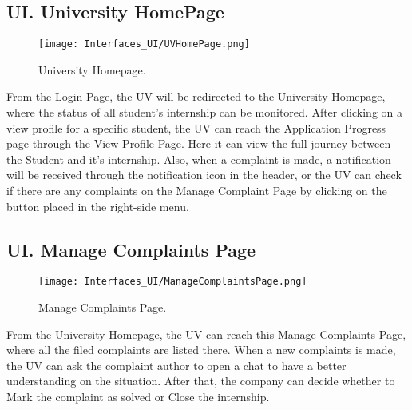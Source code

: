\subsection*{UI\cui . University HomePage}

\begin{figure}[H]
    \begin{center}
        \texttt{[image: Interfaces\_UI/UVHomePage.png]}
        \caption{University Homepage.}
        \label{fig:university_homepage}%
    \end{center}   
\end{figure}

From the Login Page, the UV will be redirected to the University Homepage, where the status of all student's internship can be monitored. After clicking on a view profile for a specific student, the UV can reach the Application Progress page through the View Profile Page. Here it can view the full journey between the Student and it's internship. Also, when a complaint is made, a notification will be received through the notification icon in the header, or the UV can check if there are any complaints on the Manage Complaint Page by clicking on the button placed in the right-side menu. 

\subsection*{UI\cui . Manage Complaints Page}

\begin{figure}[H]
    \begin{center}
        \texttt{[image: Interfaces\_UI/ManageComplaintsPage.png]}
        \caption{Manage Complaints Page.}
        \label{fig:manage_complaints_page}%
    \end{center}   
\end{figure}

From the University Homepage, the UV can reach this Manage Complaints Page, where all the filed complaints are listed there. When a new complaints is made, the UV can ask the complaint author to open a chat to have a better understanding on the situation. After that, the company can decide whether to Mark the complaint as solved or Close the internship.





